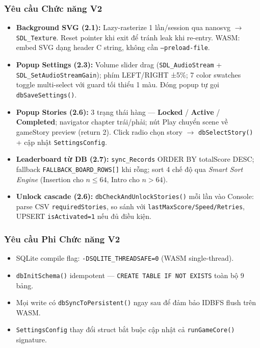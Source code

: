 \documentclass[12pt,a4paper]{article}
\begin{document}
\subsubsection{Yêu cầu Chức năng V2}
\begin{itemize}[leftmargin=*]
    \item \textbf{Background SVG (2.1):} Lazy-rasterize 1 lần/session qua nanosvg $\rightarrow$ \texttt{SDL\_Texture}. Reset pointer khi exit để tránh leak khi re-entry. WASM: embed SVG dạng header C string, không cần \texttt{--preload-file}.
    \item \textbf{Popup Settings (2.3):} Volume slider drag (\texttt{SDL\_AudioStream} + \texttt{SDL\_SetAudioStreamGain}); phím LEFT/RIGHT ±5\%; 7 color swatches toggle multi-select với guard tối thiểu 1 màu. Đóng popup tự gọi \texttt{dbSaveSettings()}.
    \item \textbf{Popup Stories (2.6):} 3 trạng thái hàng — \textbf{Locked} / \textbf{Active} / \textbf{Completed}; navigator chapter trái/phải; nút Play chuyển scene về gameStory preview (return 2). Click radio chọn story $\rightarrow$ \texttt{dbSelectStory()} + cập nhật \texttt{SettingsConfig}.
    \item \textbf{Leaderboard từ DB (2.7):} \texttt{sync\_Records} ORDER BY totalScore DESC; fallback \texttt{FALLBACK\_BOARD\_ROWS[]} khi rỗng; sort 4 chế độ qua \textit{Smart Sort Engine} (Insertion cho $n \leq 64$, Intro cho $n > 64$).
    \item \textbf{Unlock cascade (2.6):} \texttt{dbCheckAndUnlockStories()} mỗi lần vào Console: parse CSV \texttt{requiredStories}, so sánh với \texttt{lastMaxScore/Speed/Retries}, UPSERT \texttt{isActivated=1} nếu đủ điều kiện.
\end{itemize}

\subsubsection{Yêu cầu Phi Chức năng V2}
\begin{itemize}[noitemsep, leftmargin=*]
    \item SQLite compile flag: \texttt{-DSQLITE\_THREADSAFE=0} (WASM single-thread).
    \item \texttt{dbInitSchema()} idempotent — \texttt{CREATE TABLE IF NOT EXISTS} toàn bộ 9 bảng.
    \item Mọi write có \texttt{dbSyncToPersistent()} ngay sau để đảm bảo IDBFS flush trên WASM.
    \item \texttt{SettingsConfig} thay đổi struct bắt buộc cập nhật cả \texttt{runGameCore()} signature.
\end{itemize}
\end{document}
